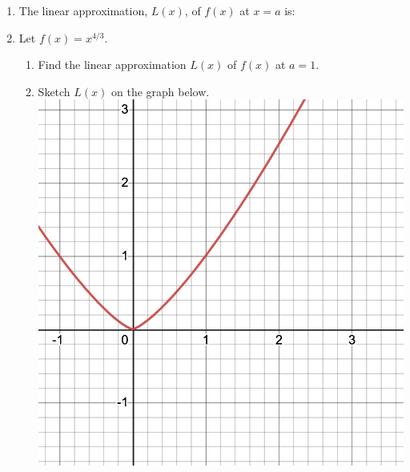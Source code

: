 \documentclass[11pt,fleqn]{article}
\begin{document}
\setlength{\parindent}{0cm}
\renewcommand{\headrulewidth}{0pt}
\newcommand{\blank}[1]{\rule{#1}{0.75pt}}
\renewcommand{\d}{\displaystyle}
\vspace*{-0.7in}
\begin{center}
 {\large{ }}
\end{center}
 \begin{enumerate}
 \item The linear approximation, $L(x)$, of $f(x)$ at $x=a$ is: 
 \vspace{.5in}
 \item Let $f(x)=x^{4/3}.$ 
 	\begin{enumerate}
	\item Find the linear approximation $L(x)$ of $f(x)$ at $a=1.$
	\vfill
	\item Sketch $L(x)$ on the graph below.\\
	\includegraphics[scale=.2]{4-2-pic.png}
	

\end{enumerate}
\end{enumerate}
\end{document}
